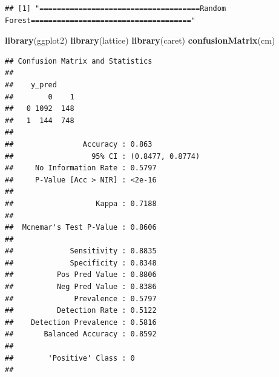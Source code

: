 \documentclass[
]{article}
\newenvironment{Shaded}{\begin{snugshade}}{\end{snugshade}}
\newcommand{\KeywordTok}[1]{\textcolor[rgb]{0.13,0.29,0.53}{\textbf{#1}}}
\newcommand{\NormalTok}[1]{#1}
\begin{document}
\begin{verbatim}
## [1] "=====================================Random Forest====================================="
\end{verbatim}

\begin{Shaded}
\begin{Highlighting}[]
\KeywordTok{library}\NormalTok{(ggplot2)}
\KeywordTok{library}\NormalTok{(lattice)}
\KeywordTok{library}\NormalTok{(caret)}
\KeywordTok{confusionMatrix}\NormalTok{(cm)}
\end{Highlighting}
\end{Shaded}

\begin{verbatim}
## Confusion Matrix and Statistics
## 
##    y_pred
##        0    1
##   0 1092  148
##   1  144  748
##                                           
##                Accuracy : 0.863           
##                  95% CI : (0.8477, 0.8774)
##     No Information Rate : 0.5797          
##     P-Value [Acc > NIR] : <2e-16          
##                                           
##                   Kappa : 0.7188          
##                                           
##  Mcnemar's Test P-Value : 0.8606          
##                                           
##             Sensitivity : 0.8835          
##             Specificity : 0.8348          
##          Pos Pred Value : 0.8806          
##          Neg Pred Value : 0.8386          
##              Prevalence : 0.5797          
##          Detection Rate : 0.5122          
##    Detection Prevalence : 0.5816          
##       Balanced Accuracy : 0.8592          
##                                           
##        'Positive' Class : 0               
## 
\end{verbatim}
\end{document}
